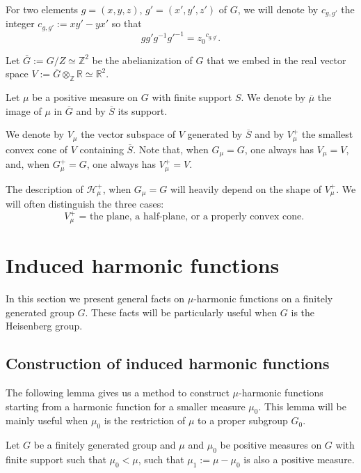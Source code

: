 \documentclass[JEP,XML,SOM,Unicode]{cedram}
\let\mathcal\mathscr
\theoremstyle{definition}
\newcommand{\m}[1]{\mathbb{ #1}}
\newcommand{\mc}[1]{\mathcal{ #1}}
\let\ol\overline
\let\bq\relax
\let\eq\relax
\begin{document}
For two elements $g=(x,y,z)$, $g'=(x',y',z')$ of $G$, we will denote
by $c_{g,g'}$ the integer $c_{g,g'}:=xy'\!-\!yx'$ so that
\begin{equation}
\label{eqncggzoc}
gg'g^{-1}{g'}^{-1}={z_0}^{c_{g,g'}}.
\end{equation}

Let $\ol{G}:=G/Z\simeq \m Z^2$ be the abelianization of $G$
that we embed in the real vector space
$V:=\ol{G}\otimes_{\m Z}\m R\simeq \m R^2$.

Let $\mu$ be a positive measure on $G$ with finite support $S$.
We denote by $\ol{\mu}$ the image of $\mu$ in $\ol{G}$ and
by $\ol{S}$ its support.

We denote by $V_\mu$ the vector subspace of $V$ generated by $\ol{S}$
and by $V^+_\mu$ the smallest convex cone of $V$ containing $\ol{S}$.
Note that, when $G_\mu=G$, one always has $V_\mu=V$,
and, when $G^+_\mu=G$, one always has $V^+_\mu=V$.

The description of $\mc H_\mu^+$, when $G_\mu=G$ will heavily depend on the shape of $V^+_\mu$.
We will often distinguish the three cases:
\begin{equation}
\label{eqnvmuphc}
\mbox{ $V^+_\mu$ = the plane, a half-plane, or a properly convex cone.}
\end{equation}

\section{Induced harmonic functions}
\label{secproof}

In this section we present general facts on $\mu$-harmonic functions
on a finitely generated group $G$. These facts will be particularly useful
when $G$ is the Heisenberg group.

\subsection{Construction of induced harmonic functions}
\label{secconind}

\bq
The following lemma gives us a method to construct
$\mu$-harmonic functions starting from a harmonic function
for a smaller measure $\mu_0$.
This lemma will be mainly useful when $\mu_0$ is the restriction of $\mu$
to a proper subgroup $G_0$.
\eq

Let $G$ be a finitely generated group and
$\mu$ and $\mu_0$ be positive measures on $G$ with finite support
such that $\mu_0 <\mu$, \ie such that $\mu_1:=\mu-\mu_0$ is also a positive measure.
\end{document}

